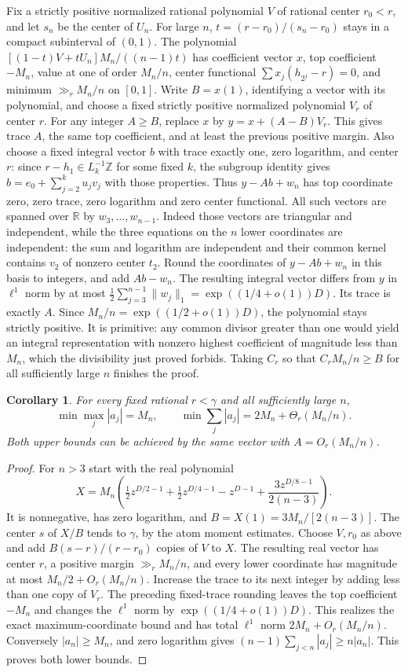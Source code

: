 \documentclass[11pt,a4paper,oneside,openany]{report}
\newtheorem{corollary}[theorem]{Corollary}
\theoremstyle{remark}\newtheorem{remark}[theorem]{Remark}
\numberwithin{equation}{section}
\begin{document}
Fix a strictly positive normalized rational polynomial $V$ of rational
center $r_0<r$, and let $s_n$ be the center of $U_n$. For large $n$,
$t=(r-r_0)/(s_n-r_0)$ stays in a compact subinterval of $(0,1)$.
The polynomial $[(1-t)V+tU_n]M_n/((n-1)t)$ has coefficient vector
$x$, top coefficient $-M_n$, value at one of order $M_n/n$, center
functional $\sum x_j(h_{2^j}-r)=0$, and minimum $\gg_r M_n/n$ on
$[0,1]$. Write $B=x(1)$, identifying a vector with its polynomial, and choose a
fixed strictly positive normalized polynomial $V_r$ of center $r$.
For any integer $A\ge B$, replace $x$ by $y=x+(A-B)V_r$. This gives
trace $A$, the same top coefficient, and at least the previous positive
margin. Also choose a fixed integral vector $b$ with trace exactly one,
zero logarithm, and center $r$: since $r-h_1\in L_{k}^{-1}\mathbb Z$ for
some fixed $k$, the subgroup identity gives $b=e_0+\sum_{j=2}^{k} u_jv_j$
with those properties. Thus $y-Ab+w_n$ has top coordinate zero, zero
trace, zero logarithm and zero center functional. All such vectors are
spanned over $\mathbb R$ by $w_3,\ldots,w_{n-1}$. Indeed those vectors
are triangular and independent, while the three equations on the $n$
lower coordinates are independent: the sum and logarithm are independent
and their common kernel contains $v_2$ of nonzero center $t_2$.
Round the coordinates of $y-Ab+w_n$ in this basis to integers,
and add $Ab-w_n$. The resulting integral vector differs from $y$ in
$\ell^1$ norm by at most $\tfrac12\sum_{j=3}^{n-1}\|w_j\|_1
=\exp((1/4+o(1))D)$. Its trace is exactly $A$. Since $M_n/n=
\exp((1/2+o(1))D)$, the polynomial stays strictly positive. It is
primitive: any common divisor greater than one would yield an integral
representation with nonzero highest coefficient of magnitude less than
$M_n$, which the divisibility just proved forbids. Taking $C_r$ so that
$C_rM_n/n\ge B$ for all sufficiently large $n$ finishes the proof.
\begin{corollary}\label{ch5:dl:height}
For every fixed rational $r<\gamma$ and all sufficiently large $n$,
\[
 \min\max_j|a_j|=M_n,\qquad
 \min\sum_j |a_j|=2M_n+\Theta_r(M_n/n).
\]
Both upper bounds can be achieved by the same vector with
$A=O_r(M_n/n)$.
\end{corollary}
\begin{proof}
For $n>3$ start with the real polynomial
\[
 X=M_n\left(\tfrac12 z^{D/2-1}+\tfrac12 z^{D/4-1}-z^{D-1}
                 +\frac{3z^{D/8-1}}{2(n-3)}\right).
\]
It is nonnegative, has zero logarithm, and $B=X(1)=3M_n/[2(n-3)]$.
The center $s$ of $X/B$ tends to $\gamma$, by the atom moment estimates.
Choose $V,r_0$ as above and add $B(s-r)/(r-r_0)$ copies of $V$ to $X$.
The resulting real vector has center $r$, a positive margin
$\gg_r M_n/n$, and every lower coordinate has magnitude at most
$M_n/2+O_r(M_n/n)$. Increase the trace to its next integer by adding
less than one copy of $V_r$. The preceding fixed-trace rounding leaves
the top coefficient $-M_n$ and changes the $\ell^1$ norm by
$\exp((1/4+o(1))D)$. This realizes the exact maximum-coordinate bound
and has total $\ell^1$ norm $2M_n+O_r(M_n/n)$.
Conversely $|a_n|\ge M_n$, and zero logarithm gives
$(n-1)\sum_{j<n}|a_j|\ge n|a_n|$. This proves both lower bounds.
\end{proof}
\end{document}
